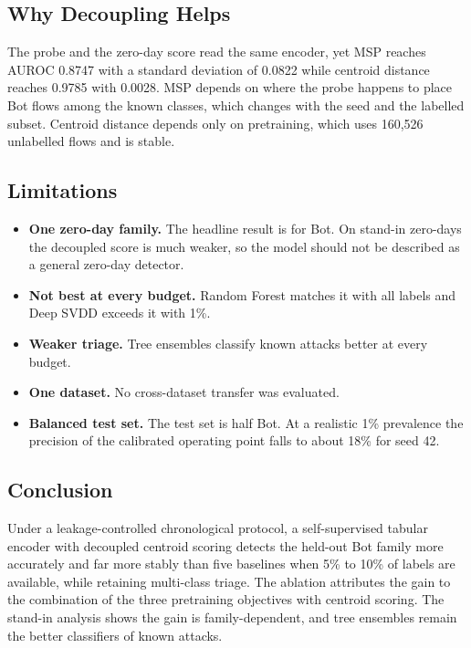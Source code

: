 \documentclass[10pt,a4paper]{article}
\begin{document}
\subsection{Why Decoupling Helps}
The probe and the zero-day score read the same encoder, yet MSP reaches AUROC 0.8747 with a standard deviation of 0.0822 while centroid distance reaches 0.9785 with 0.0028. MSP depends on where the probe happens to place Bot flows among the known classes, which changes with the seed and the labelled subset. Centroid distance depends only on pretraining, which uses 160,526 unlabelled flows and is stable.

\subsection{Limitations}
\begin{itemize}
\item \textbf{One zero-day family.} The headline result is for Bot. On stand-in zero-days the decoupled score is much weaker, so the model should not be described as a general zero-day detector.
\item \textbf{Not best at every budget.} Random Forest matches it with all labels and Deep SVDD exceeds it with 1\%.
\item \textbf{Weaker triage.} Tree ensembles classify known attacks better at every budget.
\item \textbf{One dataset.} No cross-dataset transfer was evaluated.
\item \textbf{Balanced test set.} The test set is half Bot. At a realistic 1\% prevalence the precision of the calibrated operating point falls to about 18\% for seed 42.
\end{itemize}
\subsection{Conclusion}
Under a leakage-controlled chronological protocol, a self-supervised tabular encoder with decoupled centroid scoring detects the held-out Bot family more accurately and far more stably than five baselines when 5\% to 10\% of labels are available, while retaining multi-class triage. The ablation attributes the gain to the combination of the three pretraining objectives with centroid scoring. The stand-in analysis shows the gain is family-dependent, and tree ensembles remain the better classifiers of known attacks.
\end{document}
